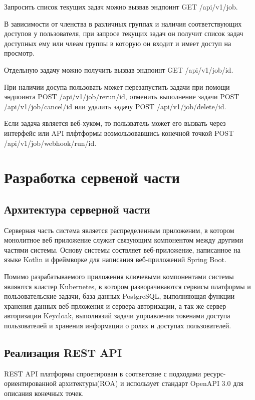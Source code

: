 Запросить список текущих задач можно вызвав эндпоинт GET /api/v1/job.

В зависимости от членства в различных группах и наличия соответствующих доступов у пользователя, при запросе текущих задач он получит список задач доступных ему или члеам группы в которую он входит и имеет доступ на просмотр.

Отдельную задачу можно получить вызвав эндпоинт GET /api/v1/job/{id}.

При наличии досупа пользовать может перезапустить задачи при помощи эндпоинта POST /api/v1/job/rerun/{id}, отменить выполнение задачи POST /api/v1/job/cancel/{id} или удалить задачу POST /api/v1/job/delete/{id}.

Если задача является веб-хуком, то пользватель может его вызвать через интерфейс или API плфтформы возмользовавшись конечной точкой POST /api/v1/job/webhook/run/{id}.

\section{Разработка сервеной части}

\subsection{Архитектура серверной части}

Серверная часть система является распределенным приложеним, в котором монолитное веб приложение служит связующим компонентом между другими частями системы.
Основу системы соствляет веб-приложение, написанное на языке Kotlin и фреймворке для написания веб-приложений Spring Boot.

Помимо разрабатываемого приложения ключевыми компонентами системы являются кластер Kubernetes, в котором разворачиваются сервисы платформы и пользовательские задачи, база данных PostgreSQL, выполняющая функции хранения данных веб-прложения и сервера авторизации, а так же сервер авторизации Keycloak, выполнязий задачи упроавления токенами доступа пользователей и хранения информации о ролях и доступах пользователей.

\subsection{Реализация REST API}

REST API платформы спроетирован в соответсвие с подходами ресурс-ориентированной архитектуры(ROA)\cite{guinard2011internet} и использует стандарт OpenAPI 3.0 для описания конечных точек.

